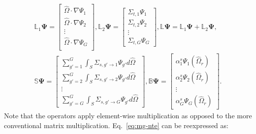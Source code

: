 \begin{gather}
  \mathbb{L}_1\bm{\Psi} =
  \begin{bmatrix}
    \hat{\Omega}\cdot\nabla\Psi_1 \\
    \hat{\Omega}\cdot\nabla\Psi_2 \\
    \vdots \\
    \hat{\Omega}\cdot\nabla\Psi_G \\
  \end{bmatrix},
  \mathbb{L}_2\bm{\Psi} =
  \begin{bmatrix}
    \Sigma_{t,1}\Psi_1 \\
    \Sigma_{t,2}\Psi_2 \\
    \vdots \\
    \Sigma_{t,G}\Psi_G
  \end{bmatrix},
  \mathbb{L}\bm{\Psi} = \mathbb{L}_1\bm{\Psi} + \mathbb{L}_2\bm{\Psi}, \nonumber \\
  \mathbb{S}\bm{\Psi} =
  \begin{bmatrix}
    \sum^G_{g'=1}\int_S \Sigma_{s,g'\rightarrow 1}\Psi_{g'}d\hat{\Omega} \\
    \sum^G_{g'=2}\int_S \Sigma_{s,g'\rightarrow 2}\Psi_{g'}d\hat{\Omega} \\
    \vdots \\
    \sum^G_{g'=G}\int_S \Sigma_{s,g'\rightarrow G}\Psi_{g'}d\hat{\Omega}
  \end{bmatrix},
  \mathbb{B}\bm{\Psi} =
  \begin{bmatrix}
    \alpha^s_1\Psi_1(\hat{\Omega}_r) \\
    \alpha^s_2\Psi_2(\hat{\Omega}_r) \\
    \vdots \\
    \alpha^s_G\Psi_G(\hat{\Omega}_r)
  \end{bmatrix}. \nonumber
\end{gather}
%
Note that the operators apply element-wise multiplication as opposed to the more conventional
matrix multiplication. Eq.\ \ref{eq:mg-nte} can be reexpressed as:
